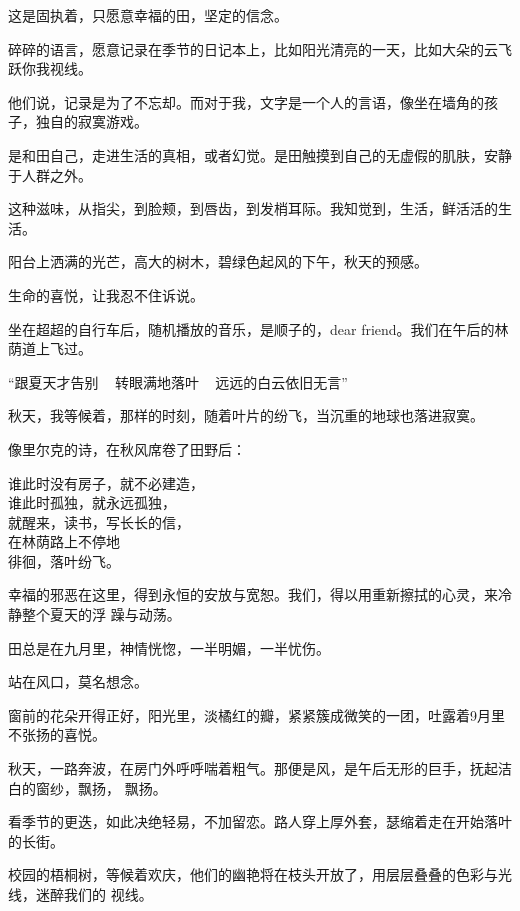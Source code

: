 		这是固执着，只愿意幸福的田，坚定的信念。

	\endwriting



		碎碎的语言，愿意记录在季节的日记本上，比如阳光清亮的一天，比如大朵的云飞跃你我视线。

		他们说，记录是为了不忘却。而对于我，文字是一个人的言语，像坐在墙角的孩子，独自的寂寞游戏。

		是和田自己，走进生活的真相，或者幻觉。是田触摸到自己的无虚假的肌肤，安静于人群之外。

		这种滋味，从指尖，到脸颊，到唇齿，到发梢耳际。我知觉到，生活，鲜活活的生活。

		阳台上洒满的光芒，高大的树木，碧绿色起风的下午，秋天的预感。

		生命的喜悦，让我忍不住诉说。

		坐在超超的自行车后，随机播放的音乐，是顺子的，dear friend。我们在午后的林荫道上飞过。

		“跟夏天才告别 ~ 转眼满地落叶 ~ 远远的白云依旧无言”

		秋天，我等候着，那样的时刻，随着叶片的纷飞，当沉重的地球也落进寂寞。

		像里尔克的诗，在秋风席卷了田野后：

		\longpoem{}{}{}
			谁此时没有房子，就不必建造，\\
			谁此时孤独，就永远孤独，\\
			就醒来，读书，写长长的信，\\
			在林荫路上不停地 \\
			徘徊，落叶纷飞。
		\endlongpoem

		幸福的邪恶在这里，得到永恒的安放与宽恕。我们，得以用重新擦拭的心灵，来冷静整个夏天的浮
	躁与动荡。

		田总是在九月里，神情恍惚，一半明媚，一半忧伤。

		站在风口，莫名想念。

	\endwriting



		窗前的花朵开得正好，阳光里，淡橘红的瓣，紧紧簇成微笑的一团，吐露着9月里不张扬的喜悦。

		秋天，一路奔波，在房门外呼呼喘着粗气。那便是风，是午后无形的巨手，抚起洁白的窗纱，飘扬，
	飘扬。

		看季节的更迭，如此决绝轻易，不加留恋。路人穿上厚外套，瑟缩着走在开始落叶的长街。

		校园的梧桐树，等候着欢庆，他们的幽艳将在枝头开放了，用层层叠叠的色彩与光线，迷醉我们的
	视线。

